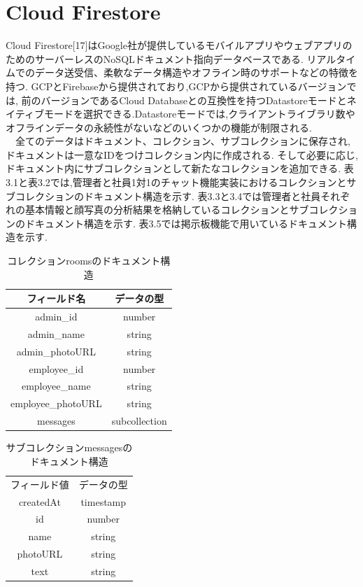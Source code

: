 \section{Cloud Firestore}
\label{sec:reference_cloud}
Cloud Firestore[17]はGoogle社が提供しているモバイルアプリやウェブアプリのためのサーバーレスのNoSQLドキュメント指向データベースである.
リアルタイムでのデータ送受信、柔軟なデータ構造やオフライン時のサポートなどの特徴を持つ.
GCPとFirebaseから提供されており,GCPから提供されているバージョンでは,
前のバージョンであるCloud Databaseとの互換性を持つDatastoreモードとネイティブモードを選択できる.Datastoreモードでは,クライアントライブラリ数やオフラインデータの永続性がないなどのいくつかの機能が制限される. \\
　全てのデータはドキュメント、コレクション、サブコレクションに保存され,
ドキュメントは一意なIDをつけコレクション内に作成される.
そして必要に応じ,ドキュメント内にサブコレクションとして新たなコレクションを追加できる.
表3.1と表3.2では,管理者と社員1対1のチャット機能実装におけるコレクションとサブコレクションのドキュメント構造を示す.
表3.3と3.4では管理者と社員それぞれの基本情報と顔写真の分析結果を格納しているコレクションとサブコレクションのドキュメント構造を示す.
表3.5では掲示板機能で用いているドキュメント構造を示す.

\begin{table}[hbtp]
  \caption{コレクションroomsのドキュメント構造}
  \label{table:data_type}
  \centering
  \begin{tabular}{c|c} \hline
    フィールド名  & データの型   \\ \hline
    admin\_id  & number  \\ 
    admin\_name  & string   \\
    admin\_photoURL  &  string \\
    employee\_id  & number  \\ 
    employee\_name  & string   \\
    employee\_photoURL  &  string \\
    messages  &  subcollection \\ \hline
  \end{tabular}
\end{table}

\begin{table}[hbtp]
  \caption{サブコレクションmessagesのドキュメント構造}
  \label{table:data_type}
  \centering
  \begin{tabular}{c|c} \hline
    フィールド値  & データの型  \\
    createdAt  & timestamp \\
    id  & number  \\
    name  & string  \\
    photoURL  &  string \\
    text  &  string \\ \hline
  \end{tabular}
\end{table}

